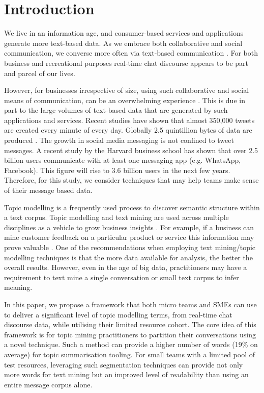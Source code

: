 \section{Introduction}
We live in an information age, and consumer-based services and applications generate more text-based data. As we embrace both collaborative and social communication, we converse more often via text-based communication \cite{talkmore2015} \cite{textstats2016}.  For both business and recreational purposes real-time chat discourse appears to be part and parcel of our lives. 

However, for businesses irrespective of size, using such collaborative and social means of communication, can be an overwhelming experience \cite{huffpost2016}. This is due in part to the large volumes of text-based data that are generated by such applications and services. Recent studies have shown that almost 350,000 tweets are created every minute of every day. Globally 2.5 quintillion bytes of data are produced \cite{venturebeat2016}. The growth in social media messaging is not confined to tweet messages. A recent study \cite{socmsg2017} by the Harvard business school has shown that over 2.5 billion users communicate with at least one messaging app (e.g. WhatsApp, Facebook). This figure will rise to 3.6 billion users in the next few years. Therefore, for this study, we consider techniques that may help teams make sense of their message based data.   

Topic modelling is a frequently used process to discover semantic structure within a text corpus. Topic modelling and text mining are used across multiple disciplines \cite{tmvalue2017} as a vehicle to grow business insights \cite{dti2017}. For example, if a business can mine customer feedback on a particular product or service this information may prove valuable \cite{softadvice2015}. One of the recommendations when employing text mining/topic modelling techniques is that the more data available for analysis, the better the overall results. However, even in the age of big data, practitioners may have a requirement to text mine a single conversation or small text corpus to infer meaning. 

In this paper, we propose a framework that both micro teams and SMEs can use to deliver a significant level of topic modelling terms, from real-time chat discourse data, while utilising their limited resource cohort. The core idea of this framework is for topic mining practitioners to partition their conversations using a novel technique. Such a method can provide a higher number of words (19\% on average) for topic summarisation tooling. For small teams with a limited pool of test resources, leveraging such segmentation techniques can provide not only more words for text mining but an improved level of readability than using an entire message corpus alone.

